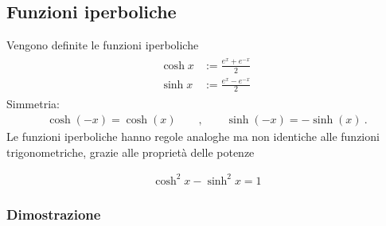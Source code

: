 \documentclass[letterpaper,10pt,italian]{jupyterBook}
\begin{document}
\subsection{Funzioni iperboliche}
\label{\detokenize{ch/precalculus/exponential_logarithm:funzioni-iperboliche}}\label{\detokenize{ch/precalculus/exponential_logarithm:math-hs-exp-def-hyp}}
\sphinxAtStartPar
Vengono definite le funzioni iperboliche
\begin{equation}\label{equation:ch/precalculus/exponential_logarithm:eq:hyperbolic:def}
\begin{split}\begin{aligned}
  \cosh x & := \frac{e^x + e^{-x}}{2} \\
  \sinh x & := \frac{e^x - e^{-x}}{2} \ 
\end{aligned}\end{split}
\end{equation}
\sphinxAtStartPar
{}
Simmetria:
\begin{equation}\label{equation:ch/precalculus/exponential_logarithm:eq:hyperbolic:symmetry}
\begin{split}\cosh(-x) = \cosh(x) \qquad , \qquad \sinh(-x) = - \sinh(x) \ .\end{split}
\end{equation}
\sphinxAtStartPar
Le funzioni iperboliche hanno regole analoghe \sphinxhyphen{} ma non identiche \sphinxhyphen{} alle funzioni trigonometriche, {\hyperref[\detokenize{ch/precalculus/exponential_logarithm-notes:math-hs-exp-log-notes-hyp}]{}} grazie alle proprietà delle potenze

\sphinxAtStartPar
{}
\begin{equation}\label{equation:ch/precalculus/exponential_logarithm:eq:hyperbolic-fundamental}
\begin{split}\cosh^2 x - \sinh^2 x = 1\end{split}
\end{equation}\subsubsection*{Dimostrazione}
\end{document}
